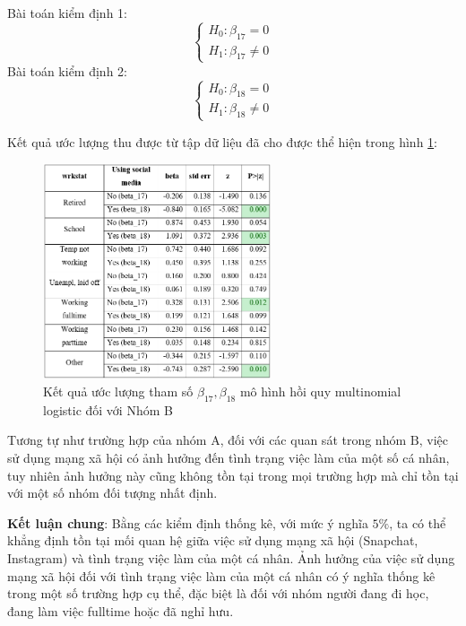Bài toán kiểm định 1:
$$
\left\{\begin{array}{l}
H_{0}: \beta_{17}=0 \\
H_{1}: \beta_{17} \neq 0
\end{array}\right.
$$
Bài toán kiểm định 2:
$$
\left\{\begin{array}{l}
H_{0}: \beta_{18}=0 \\
H_{1}: \beta_{18} \neq 0
\end{array}\right.
$$

Kết quả ước lượng thu được từ tập dữ liệu đã cho được thể hiện trong hình \ref{fig:beta1718}:

\begin{figure}[h!]
    \centering
    \includegraphics[width=0.6\textwidth]{figures/beta1718.png}
    \caption{Kết quả ước lượng tham số $\beta_{17}, \beta_{18}$ mô hình hồi quy multinomial logistic đối với Nhóm B}
    \label{fig:beta1718}
\end{figure}

Tương tự như trường hợp của nhóm $\mathrm{A}$, đối với các quan sát trong nhóm $\mathrm{B}$, việc sử dụng mạng xã hội có ảnh hưởng đến tình trạng việc làm của một số cá nhân, tuy nhiên ảnh hưởng này cũng không tồn tại trong mọi trường hợp mà chỉ tồn tại với một số nhóm đối tượng nhất định.


\textbf{Kết luận chung}: Bằng các kiểm định thống kê, với mức ý nghĩa $5 \%$, ta có thể khẳng định tồn tại mối quan hệ giữa việc sử dụng mạng xã hội (Snapchat, Instagram) và tình trạng việc làm của một cá nhân. Ảnh hưởng của việc sử dụng mạng xã hội đối với tình trạng việc làm của một cá nhân có ý nghĩa thống kê trong một số trường hợp cụ thể, đặc biệt là đối với nhóm người đang đi học, đang làm việc fulltime hoặc đã nghỉ hưu.